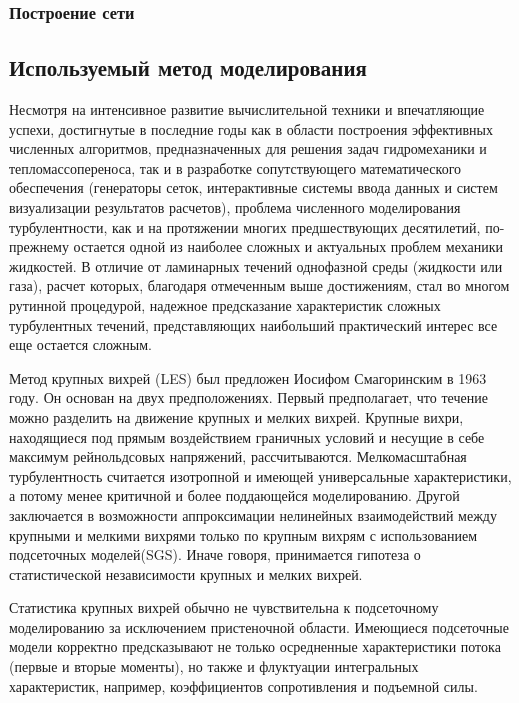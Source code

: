\documentclass[a4paper]{article}
\begin{document}
	\subsubsection{Построение сети}
	\subsection{Используемый метод моделирования}
		Несмотря на интенсивное развитие вычислительной техники и впечатляющие успехи, достигнутые в последние годы как в области построения эффективных численных алгоритмов, предназначенных для решения задач гидромеханики и тепломассопереноса, так и в разработке сопутствующего математического обеспечения (генераторы сеток, интерактивные системы ввода данных и систем визуализации результатов расчетов), проблема численного моделирования турбулентности, как и на протяжении многих предшествующих десятилетий, по-прежнему остается одной из наиболее сложных и актуальных проблем механики жидкостей. В отличие от ламинарных течений однофазной среды (жидкости или газа), расчет которых, благодаря отмеченным выше достижениям, стал во многом рутинной процедурой, надежное предсказание характеристик сложных турбулентных течений, представляющих наибольший практический интерес все еще остается сложным.
		
		Метод крупных вихрей (LES) был предложен Иосифом Смагоринским в 1963 году. Он основан на двух предположениях. Первый предполагает, что течение можно разделить на движение крупных и мелких вихрей. Крупные вихри, находящиеся под прямым воздействием граничных условий и несущие в себе максимум рейнольдсовых напряжений, рассчитываются. Мелкомасштабная турбулентность считается изотропной и имеющей универсальные характеристики, а потому менее критичной и более поддающейся моделированию. Другой  заключается в возможности аппроксимации нелинейных взаимодействий между крупными и мелкими вихрями только по крупным вихрям с использованием подсеточных моделей(SGS). Иначе говоря, принимается гипотеза о статистической независимости крупных и мелких вихрей.
		
		Статистика крупных вихрей обычно не чувствительна к подсеточному моделированию за исключением пристеночной области. Имеющиеся подсеточные модели корректно предсказывают не только осредненные характеристики потока (первые и вторые моменты), но также и флуктуации интегральных характеристик, например, коэффициентов сопротивления и подъемной силы\cite{Fureby2000}.
		
\end{document}

